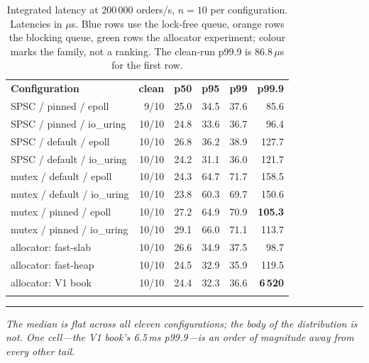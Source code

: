 \documentclass[conference]{IEEEtran}
\newcommand{\reading}[1]{%
  \par\vspace{1pt}\noindent
  \textcolor{corange}{\rule[-0.2ex]{2.2pt}{1.05em}}\hspace{3pt}%
  \textit{\textcolor{cgray}{#1}}\par\vspace{2pt}}
\newcommand{\us}{\,$\mu$s}
\begin{document}
\begin{table}[!t]
\centering
\caption{Integrated latency at 200\,000 orders/s, $n=10$ per configuration.
Latencies in $\mu$s. Blue rows use the lock-free queue, orange rows the blocking
queue, green rows the allocator experiment; colour marks the family, not a
ranking. The clean-run p99.9 is 86.8\us{} for the first row.}
\label{tab:latency}
\small
\setlength{\tabcolsep}{7pt}
\begin{tabular}{@{}lrrrrr@{}}
\arrayrulecolor{cblue}\toprule
\rowcolor{cblueL}\textbf{Configuration} & \textbf{clean} & \textbf{p50} & \textbf{p95} & \textbf{p99} & \textbf{p99.9} \\
\arrayrulecolor{cblue!45}\midrule
\rowcolor{cblueL!55}SPSC / pinned / epoll     & 9/10  & 25.0 & 34.5 & 37.6 & 85.6 \\
\rowcolor{cblueL!55}SPSC / pinned / io\_uring & 10/10 & 24.8 & 33.6 & 36.7 & 96.4 \\
\rowcolor{cblueL!55}SPSC / default / epoll    & 10/10 & 26.8 & 36.2 & 38.9 & 127.7 \\
\rowcolor{cblueL!55}SPSC / default / io\_uring& 10/10 & 24.2 & 31.1 & 36.0 & 121.7 \\
\arrayrulecolor{corange!45}\midrule
\rowcolor{corangeL!70}mutex / default / epoll  & 10/10 & 24.3 & 64.7 & 71.7 & 158.5 \\
\rowcolor{corangeL!70}mutex / default / io\_uring& 10/10 & 23.8 & 60.3 & 69.7 & 150.6 \\
\rowcolor{corangeL!70}mutex / pinned / epoll   & 10/10 & 27.2 & 64.9 & 70.9 & \textbf{105.3} \\
\rowcolor{corangeL!70}mutex / pinned / io\_uring& 10/10 & 29.1 & 66.0 & 71.1 & 113.7 \\
\arrayrulecolor{cgreen!45}\midrule
\rowcolor{cgreenL!80}allocator: fast-slab     & 10/10 & 26.6 & 34.9 & 37.5 & 98.7 \\
\rowcolor{cgreenL!80}allocator: fast-heap     & 10/10 & 24.5 & 32.9 & 35.9 & 119.5 \\
\rowcolor{cgreenL!80}allocator: V1 book       & 10/10 & 24.4 & 32.3 & 36.6 & \cellcolor{cred!25}\textcolor{cred}{\textbf{6\,520}} \\
\arrayrulecolor{cblue}\bottomrule
\end{tabular}
\end{table}

\reading{The median is flat across all eleven configurations; the body of the
distribution is not. One cell---the V1 book's 6.5\,ms p99.9---is an order of
magnitude away from every other tail.}
\end{document}
